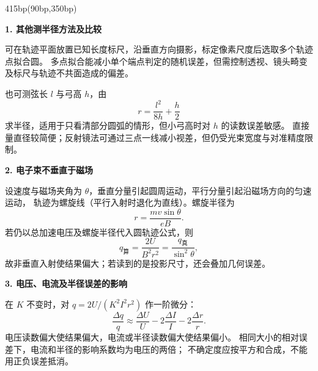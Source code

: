 \documentclass{article}
\newenvironment{AnswerBlock}[1]{%
\begin{textblock*}{415bp}(90bp,#1bp)
\fontsize{10.5bp}{14.5bp}\selectfont
\setlength{\abovedisplayskip}{5bp}
\setlength{\belowdisplayskip}{5bp}
\setlength{\abovedisplayshortskip}{3bp}
\setlength{\belowdisplayshortskip}{3bp}
}{\end{textblock*}}
\begin{document}
\begin{AnswerBlock}{350}
\textbf{1. 其他测半径方法及比较}

可在轨迹平面放置已知长度标尺，沿垂直方向摄影，标定像素尺度后选取多个轨迹点拟合圆。
多点拟合能减小单个端点判定的随机误差，但需控制透视、镜头畸变及标尺与轨迹不共面造成的偏差。

也可测弦长 $l$ 与弓高 $h$，由
\[
r=\frac{l^2}{8h}+\frac h2
\]
求半径，适用于只看清部分圆弧的情形，但小弓高时对 $h$ 的读数误差敏感。
直接量直径较简便；反射镜法可通过三点一线减小视差，但仍受光束宽度与对准精度限制。

\textbf{2. 电子束不垂直于磁场}

设速度与磁场夹角为 $\theta$，垂直分量引起圆周运动，平行分量引起沿磁场方向的匀速运动，
轨迹为螺旋线（平行入射时退化为直线）。螺旋半径为
\[
r=\frac{mv\sin\theta}{eB}.
\]
若仍以总加速电压及螺旋半径代入圆轨迹公式，则
\[
q_{\text{算}}=\frac{2U}{B^2r^2}=\frac{q_{\text{真}}}{\sin^2\theta},
\]
故非垂直入射使结果偏大；若读到的是投影尺寸，还会叠加几何误差。

\textbf{3. 电压、电流及半径误差的影响}

在 $K$ 不变时，对 $q=2U/(K^2I^2r^2)$ 作一阶微分：
\[
\frac{\Delta q}{q}\approx
\frac{\Delta U}{U}-2\frac{\Delta I}{I}-2\frac{\Delta r}{r}.
\]
电压读数偏大使结果偏大，电流或半径读数偏大使结果偏小。
相同大小的相对误差下，电流和半径的影响系数均为电压的两倍；
不确定度应按平方和合成，不能用正负误差抵消。
\end{AnswerBlock}
\null
\end{document}
